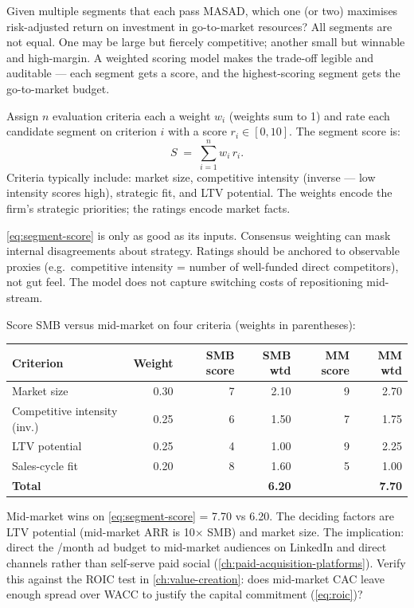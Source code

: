 Given multiple segments that each pass MASAD, which one (or two) maximises risk-adjusted return on investment in go-to-market resources? All segments are not equal. One may be large but fiercely competitive; another small but winnable and high-margin. A weighted scoring model makes the trade-off legible and auditable --- each segment gets a score, and the highest-scoring segment gets the go-to-market budget.

Assign \(n\) evaluation criteria each a weight \(w_i\) (weights sum to 1) and rate each candidate segment on criterion \(i\) with a score \(r_i \in [0,10]\). The segment score is:
\begin{equation}\label{eq:segment-score}
  S \;=\; \sum_{i=1}^{n} w_i\, r_i .
\end{equation}
Criteria typically include: market size, competitive intensity (inverse --- low intensity scores high), strategic fit, and LTV potential. The weights encode the firm's strategic priorities; the ratings encode market facts.

\cref{eq:segment-score} is only as good as its inputs. Consensus weighting can mask internal disagreements about strategy. Ratings should be anchored to observable proxies (e.g.\ competitive intensity = number of well-funded direct competitors), not gut feel. The model does not capture switching costs of repositioning mid-stream.

\begin{example}
Score SMB versus mid-market on four criteria (weights in parentheses):

\medskip
{\small
\begin{tabular}{lrrrrr}
  \toprule
  Criterion & Weight & SMB score & SMB wtd & MM score & MM wtd \\
  \midrule
  Market size          & 0.30 & 7 & 2.10 & 9 & 2.70 \\
  Competitive intensity (inv.) & 0.25 & 6 & 1.50 & 7 & 1.75 \\
  LTV potential        & 0.25 & 4 & 1.00 & 9 & 2.25 \\
  Sales-cycle fit      & 0.20 & 8 & 1.60 & 5 & 1.00 \\
  \midrule
  \textbf{Total}       &      &   & \textbf{6.20} & & \textbf{7.70} \\
  \bottomrule
\end{tabular}}
\medskip

Mid-market wins on \cref{eq:segment-score} = 7.70 vs 6.20. The deciding factors are LTV potential (mid-market ARR is 10$\times$ SMB) and market size. The implication: direct the /month ad budget to mid-market audiences on LinkedIn and direct channels rather than self-serve paid social (\cref{ch:paid-acquisition-platforms}). Verify this against the ROIC test in \cref{ch:value-creation}: does mid-market CAC leave enough spread over WACC to justify the capital commitment (\cref{eq:roic})?
\end{example}

